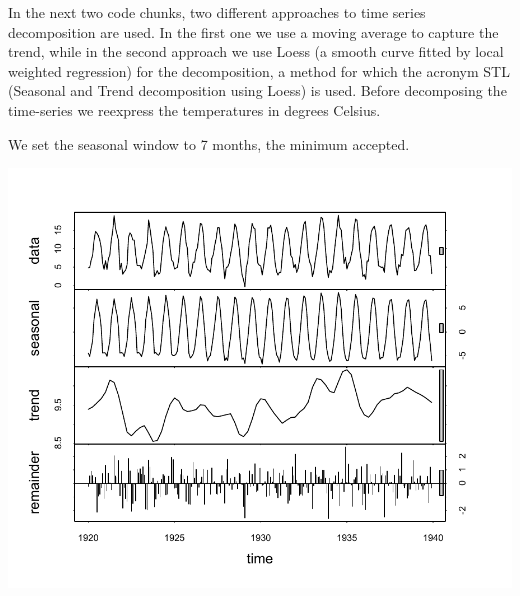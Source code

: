 \documentclass[krantz2]{krantz}\usepackage{knitr}
\begin{document}
In the next two code chunks, two different approaches to time series decomposition are used. In the first one we use a moving average to capture the trend, while in the second approach we use Loess (a smooth curve fitted by local weighted regression) for the decomposition, a method for which the acronym STL (Seasonal and Trend decomposition using Loess) is used. Before decomposing the time-series we reexpress the temperatures in degrees Celsius.

\begin{knitrout}\footnotesize
{}\color{fgcolor}\begin{kframe}
\begin{alltt}
 \hlkwb{<-}  \hlopt{-} \hlstd{)} \hlopt{*} \hlopt{/}
\end{alltt}
\end{kframe}
\end{knitrout}

We set the seasonal window to 7 months, the minimum accepted.


\begin{knitrout}\footnotesize
{}\color{fgcolor}\begin{kframe}
\begin{alltt}
 \hlkwb{<-}   \hlstd{=} \hlstd{)}
\end{alltt}
\end{kframe}

{\centering \includegraphics[width=.7\textwidth]{figure/pos-ts-05-1}

}



\end{knitrout}
\end{document}

